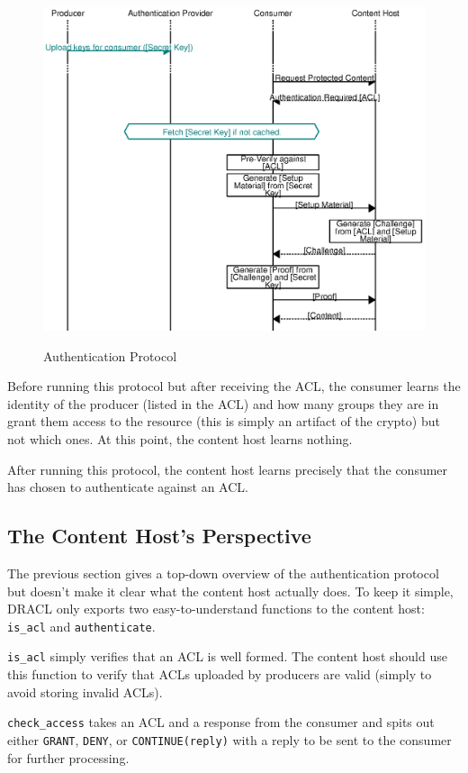 \documentclass[pdftex,12pt,a4papaer,twoside,notitlepage]{report}
\begin{document}
\begin{figure}
    \includegraphics{auth.eps}
    \label{fig:auth}
    \caption{Authentication Protocol}
\end{figure}

Before running this protocol but after receiving the ACL, the consumer learns
the identity of the producer (listed in the ACL) and how many groups they are in
grant them access to the resource (this is simply an artifact of the crypto) but
not which ones. At this point, the content host learns nothing.

After running this protocol, the content host learns precisely that the consumer
has chosen to authenticate against an ACL.

\subsection{The Content Host's Perspective}

The previous section gives a top-down overview of the authentication protocol
but doesn't make it clear what the content host actually does. To keep it
simple, DRACL only exports two easy-to-understand functions to the content host:
\verb=is_acl= and \verb=authenticate=.

\verb=is_acl= simply verifies that an ACL is well formed. The content host
should use this function to verify that ACLs uploaded by producers are valid
(simply to avoid storing invalid ACLs).

\verb=check_access= takes an ACL and a response from the consumer and spits out
either \verb=GRANT=, \verb=DENY=, or \verb=CONTINUE(reply)= with a reply to be
sent to the consumer for further processing.
\end{document}
